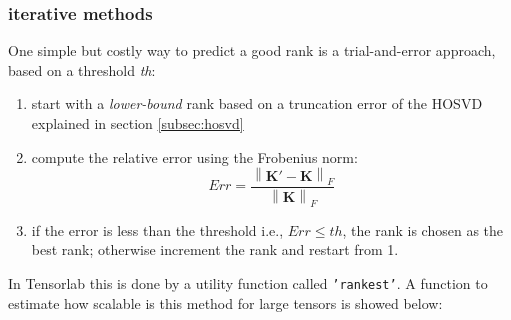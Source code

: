 \subsubsection{iterative methods}
One simple but costly way to predict a good rank is a trial-and-error approach, based on a threshold \emph{th}:
	\begin{enumerate}
		\item start with a \emph{lower-bound} rank based on a truncation error of the HOSVD explained in section \ref{subsec:hosvd}
		\item compute the relative error using the Frobenius norm: $$ Err = \frac{\left \| \mathbf{K'} - \mathbf{K}  \right \|_{F}}{\left \| \mathbf{K} \right \|_{F}}$$
		\item if the error is less than the threshold i.e., $Err \leq th$, the rank is chosen as the best rank; otherwise increment the rank and restart from 1. 
	\end{enumerate}

In Tensorlab this is done by a utility function called \texttt{'rankest'}. A function to estimate how scalable is this method for large tensors is showed below: 


